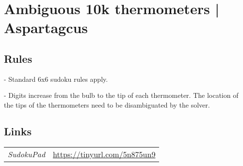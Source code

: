 \section{Ambiguous 10k thermometers | {\normalfont Aspartagcus}}
\label{sec:11-ambiguous-10k-thermometers-aspartagcus}

\subsection*{Rules}
\begin{markdown}
- Standard 6x6 sudoku rules apply.

- Digits increase from the bulb to the tip of each thermometer. The location of the tips of the thermometers need to be disambiguated by the solver.
\end{markdown}
\subsection*{Links}
\begin{tabularx}{\textwidth}{l X}
\emph{SudokuPad} & \url{https://tinyurl.com/5n875un9} \\
\end{tabularx}
\pagebreak
